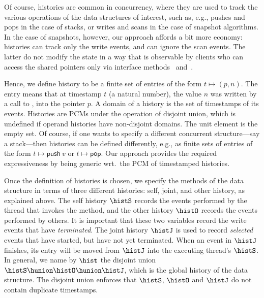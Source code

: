 %
%

Of course, histories are common in concurrency, where they are used to
track the various operations of the data structures of interest, such
as, e.g., pushes and pops in the case of stacks, or writes and scans
in the case of snapshot algorithms. In the case of snapshots, however,
our approach affords a bit more economy: histories can track only the
write events, and can ignore the scan events. The latter do not modify
the state in a way that is observable by clients who can access
the shared pointers only via interface methods \jywrite\ and\ \jyscan.

Hence, we define history to be a finite set of entries of the form $t
\mapsto (p, n)$. The entry means that at timestamp $t$ (a natural
number), the value $n$ was written by a call to \jywrite, into the
pointer $p$. A domain of a history is the set of timestamps of its
events. Histories are PCMs under the operation of disjoint union,
which is undefined if operand histories have non-disjoint domains. The
unit element is the empty set. Of course, if one wants to specify a
different concurrent structure---say a stack---then histories can be
defined differently, e.g., as finite sets of entries of the form $t
\mapsto \mathsf{push}\ v$ or $t \mapsto \mathsf{pop}$. Our approach
provides the required expressiveness by being generic wrt.~the PCM of
timestamped histories.

Once the definition of histories is chosen, we specify the methods of
the data structure in terms of three different histories: self, joint,
and other history, as explained above. The self history $\histS$
records the events performed by the thread that invokes the method,
and the other history $\histO$ records the events performed by
others. It is important that these two variables record the write
events that have \emph{terminated}. The joint history $\histJ$ is used
to record \emph{selected} events that have started, but have not yet
terminated. When an event in $\histJ$ finishes, its entry will be
moved from $\histJ$ into the executing thread's $\histS$. In general,
we name by $\hist$ the disjoint union $\histS \hunion \histO \hunion
\histJ$, which is the global history of the data structure. The
disjoint union enforces that $\histS$, $\histO$ and $\histJ$ do not
contain duplicate timestamps.

